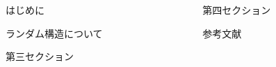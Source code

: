 \begin{frame}[t]{}
		
		\vspace{10mm}
		
		\begin{columns}[T]
			\begin{column}{.49\linewidth}
				\begin{block}{はじめに}
					
				\end{block}
				\begin{block}{ランダム構造について}
					
				\end{block}
				\begin{block}{第三セクション}
				\end{block}
				\end{column}
				\begin{column}{.49\linewidth}
				\begin{block}{第四セクション}
				\end{block}
				\begin{block}{参考文献}
					
				\end{block}
			\end{column}
		\end{columns}
		\end{frame}